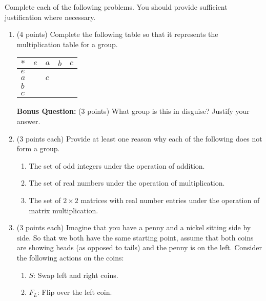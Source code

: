 \documentclass[11pt]{article}
\theoremstyle{definition}
\begin{document}
Complete each of the following problems.  You should provide sufficient justification where necessary.

\begin{enumerate}

\item (4 points) Complete the following table so that it represents the multiplication table for a group.

\begin{center}
\begin{tabular}{|x{.75cm}||x{.75cm}|x{.75cm}|x{.75cm}|x{.75cm}|}\hline $*$ & $e$ & $a$ & $b$ & $c$ \tabularnewline \hline\hline $e$ &  &  &  & \tabularnewline\hline $a$ &  & $c$ &  &  \tabularnewline \hline $b$ &  &  &  &  \tabularnewline \hline $c$ &  &  &  &  \tabularnewline \hline 
\end{tabular}
\end{center}
\textbf{Bonus Question:} (3 points) What group is this in disguise?  Justify your answer.

\item (3 points each) Provide at least one reason why each of the following does not form a group.
\begin{enumerate}
\item The set of odd integers under the operation of addition.

\item The set of real numbers under the operation of multiplication.

\item The set of $2\times 2$ matrices with real number entries under the operation of matrix multiplication.

\end{enumerate}

\item (3 points each) Imagine that you have a penny and a nickel sitting side by side.  So that we both have the same starting point, assume that both coins are showing heads (as opposed to tails) and the penny is on the left.  Consider the following actions on the coins:

\begin{enumerate}

\item[] $S$: Swap left and right coins. 

\item[] $F_L$: Flip over the left coin.

\end{enumerate}


\end{enumerate}
\end{document}
